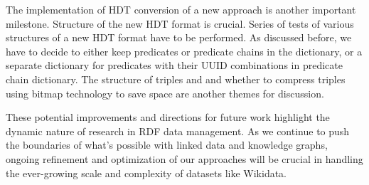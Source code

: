 The implementation of HDT conversion of a new approach is another important milestone. Structure of the new HDT format is crucial. Series of tests of various structures of a new HDT format have to be performed. As discussed before, we have to decide to either keep predicates or predicate chains in the dictionary, or a separate dictionary for predicates with their UUID combinations in predicate chain dictionary. The structure of triples and and whether to compress triples using bitmap technology to save space are another themes for discussion.

These potential improvements and directions for future work highlight the dynamic nature of research in RDF data management. As we continue to push the boundaries of what's possible with linked data and knowledge graphs, ongoing refinement and optimization of our approaches will be crucial in handling the ever-growing scale and complexity of datasets like Wikidata.





